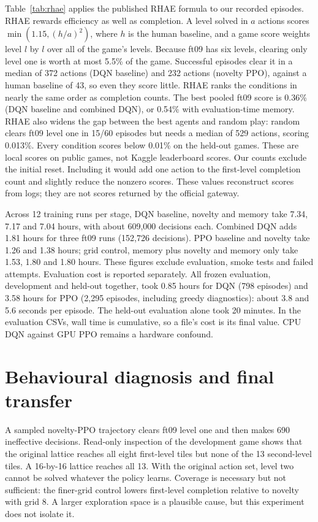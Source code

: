 \documentclass[10pt]{article}
\begin{document}
Table~\ref{tab:rhae} applies the published RHAE formula to our recorded episodes. RHAE rewards efficiency as well as completion. A level solved in $a$ actions scores $\min(1.15,(h/a)^2)$, where $h$ is the human baseline, and a game score weights level $l$ by $l$ over all of the game's levels. Because ft09 has six levels, clearing only level one is worth at most 5.5\% of the game. Successful episodes clear it in a median of 372 actions (DQN baseline) and 232 actions (novelty PPO), against a human baseline of 43, so even they score little. RHAE ranks the conditions in nearly the same order as completion counts. The best pooled ft09 score is 0.36\% (DQN baseline and combined DQN), or 0.54\% with evaluation-time memory. RHAE also widens the gap between the best agents and random play: random clears ft09 level one in 15/60 episodes but needs a median of 529 actions, scoring 0.013\%. Every condition scores below 0.01\% on the held-out games. These are local scores on public games, not Kaggle leaderboard scores. Our counts exclude the initial reset. Including it would add one action to the first-level completion count and slightly reduce the nonzero scores. These values reconstruct scores from logs; they are not scores returned by the official gateway.

Across 12 training runs per stage, DQN baseline, novelty and memory take 7.34, 7.17 and 7.04 hours, with about 609,000 decisions each. Combined DQN adds 1.81 hours for three ft09 runs (152,726 decisions). PPO baseline and novelty take 1.26 and 1.38 hours; grid control, memory plus novelty and memory only take 1.53, 1.80 and 1.80 hours. These figures exclude evaluation, smoke tests and failed attempts. Evaluation cost is reported separately. All frozen evaluation, development and held-out together, took 0.85 hours for DQN (798 episodes) and 3.58 hours for PPO (2,295 episodes, including greedy diagnostics): about 3.8 and 5.6 seconds per episode. The held-out evaluation alone took 20 minutes. In the evaluation CSVs, wall time is cumulative, so a file's cost is its final value. CPU DQN against GPU PPO remains a hardware confound.

\section{Behavioural diagnosis and final transfer}
A sampled novelty-PPO trajectory clears ft09 level one and then makes 690 ineffective decisions. Read-only inspection of the development game shows that the original lattice reaches all eight first-level tiles but none of the 13 second-level tiles. A 16-by-16 lattice reaches all 13. With the original action set, level two cannot be solved whatever the policy learns. Coverage is necessary but not sufficient: the finer-grid control lowers first-level completion relative to novelty with grid 8. A larger exploration space is a plausible cause, but this experiment does not isolate it.
\end{document}
